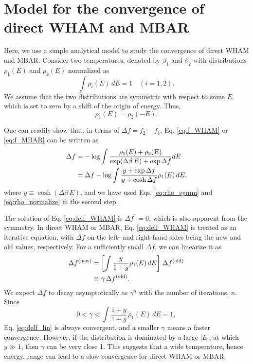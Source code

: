 \documentclass[reprint,aip,jcp,superscriptaddress]{revtex4-1}
\begin{document}
\section{\label{sec:convwham}
Model for the convergence of direct WHAM and MBAR}



Here, we use a simple analytical model
to study the convergence of direct WHAM and MBAR.
%
Consider two temperatures,
denoted by $\beta_1$ and $\beta_2$
with distributions $\rho_1(E)$ and $\rho_2(E)$
normalized as
%
\begin{equation}
\int \rho_i(E) \, dE
= 1
\quad
(i = 1, 2).
\label{eq:rho_normalize}
\end{equation}
%
We assume that the two distributions
are symmetric with respect to some $\bar E$,
which is set to zero
by a shift of the origin of energy.
%
Thus,
\begin{equation}
\rho_1(E)
=
\rho_2(-E).
\label{eq:rho_symm}
\end{equation}



One can readily show that,
in terms of $\Delta f = f_2 - f_1$,
Eq. \eqref{eq:f_WHAM} or \eqref{eq:f_MBAR}
can be written as
%
\begin{align}
\Delta f
&=
-\log \int
\frac{ \rho_1(E) + \rho_2(E) }
{ \exp(\Delta \beta \, E) + \exp \Delta f }
dE
\notag \\
&=
\Delta f
-
\log
  \int
    \frac{ y + \exp \Delta f }
         { y + \cosh \Delta f }
    \rho_1(E) \, dE,
\label{eq:delf_WHAM}
\end{align}
%
where $y \equiv \cosh(\Delta \beta \, E)$,
and we have used
Eqs. \eqref{eq:rho_symm} and
\eqref{eq:rho_normalize}
in the second step.



The solution of Eq. \eqref{eq:delf_WHAM}
is $\Delta f^* = 0$,
which is also apparent from the symmetry.
%
In direct WHAM or MBAR,
Eq. \eqref{eq:delf_WHAM}
is treated as an iterative equation,
with $\Delta f$
on the left- and right-hand sides
being the new and old values,
respectively.
%
For a sufficiently small $\Delta f$,
we can linearize it as
%
\begin{align}
\Delta f^\mathrm{(new)}
&=
\left[
  \int
    \frac{ y } { 1 + y }
    \rho_1(E) \, dE
\right] \,
\Delta f^\mathrm{(old)}
\notag\\
&\equiv
\gamma \,
\Delta f^\mathrm{(old)}.
\label{eq:delf_lin}
\end{align}
%
We expect
$\Delta f$
to decay asymptotically as $\gamma^n$
with the number of iterations, $n$.
%
Since
\[
0 < \gamma < \int
\frac{1 + y}
{1 + y}
\, \rho_1(E) \, dE = 1,
\]
Eq. \eqref{eq:delf_lin}
is always convergent,
and a smaller $\gamma$ means
a faster convergence.
%
However,
if the distribution
is dominated by a large $|E|$,
at which $y \gg 1$,
%
then $\gamma$
can be very close 1.
%
This suggests that
a wide temperature, hence energy, range
can lead to a slow convergence
for direct WHAM or MBAR.
\end{document}
